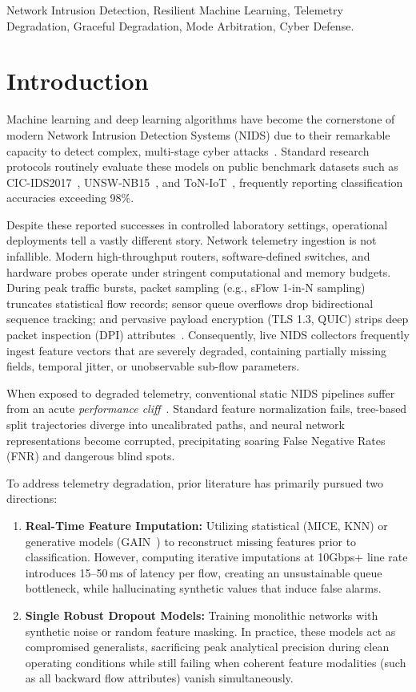 \documentclass[conference]{IEEEtran}
\begin{document}
\begin{IEEEkeywords}
Network Intrusion Detection, Resilient Machine Learning, Telemetry Degradation, Graceful Degradation, Mode Arbitration, Cyber Defense.
\end{IEEEkeywords}

\section{Introduction}
Machine learning and deep learning algorithms have become the cornerstone of modern Network Intrusion Detection Systems (NIDS) due to their remarkable capacity to detect complex, multi-stage cyber attacks~\cite{sharafaldin2018toward}. Standard research protocols routinely evaluate these models on public benchmark datasets such as CIC-IDS2017~\cite{sharafaldin2018toward}, UNSW-NB15~\cite{moustafa2015unsw}, and ToN-IoT~\cite{al2020ton}, frequently reporting classification accuracies exceeding 98\%. 

Despite these reported successes in controlled laboratory settings, operational deployments tell a vastly different story. Network telemetry ingestion is not infallible. Modern high-throughput routers, software-defined switches, and hardware probes operate under stringent computational and memory budgets. During peak traffic bursts, packet sampling (e.g., sFlow 1-in-N sampling) truncates statistical flow records; sensor queue overflows drop bidirectional sequence tracking; and pervasive payload encryption (TLS 1.3, QUIC) strips deep packet inspection (DPI) attributes~\cite{altay2026gradient}. Consequently, live NIDS collectors frequently ingest feature vectors that are severely degraded, containing partially missing fields, temporal jitter, or unobservable sub-flow parameters.

When exposed to degraded telemetry, conventional static NIDS pipelines suffer from an acute \textit{performance cliff}~\cite{yin2024resilient}. Standard feature normalization fails, tree-based split trajectories diverge into uncalibrated paths, and neural network representations become corrupted, precipitating soaring False Negative Rates (FNR) and dangerous blind spots.

To address telemetry degradation, prior literature has primarily pursued two directions:
\begin{enumerate}
    \item \textbf{Real-Time Feature Imputation:} Utilizing statistical (MICE, KNN) or generative models (GAIN~\cite{yoon2018gain}) to reconstruct missing features prior to classification. However, computing iterative imputations at 10Gbps+ line rate introduces 15--50\,ms of latency per flow, creating an unsustainable queue bottleneck, while hallucinating synthetic values that induce false alarms.
    \item \textbf{Single Robust Dropout Models:} Training monolithic networks with synthetic noise or random feature masking. In practice, these models act as compromised generalists, sacrificing peak analytical precision during clean operating conditions while still failing when coherent feature modalities (such as all backward flow attributes) vanish simultaneously.
\end{enumerate}
\end{document}
